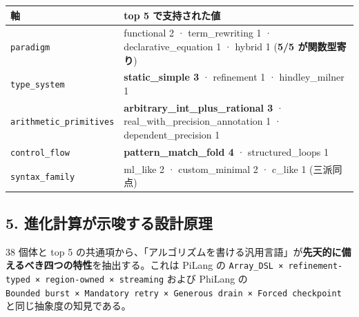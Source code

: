 \documentclass[
]{ltjsarticle}
\newcounter{none} %
\begin{document}
{\def\LTcaptype{none} %
\begin{longtable}[]{@{}
  >{\raggedright\arraybackslash}p{}
  >{\raggedright\arraybackslash}p{}@{}}
\toprule\noalign{}
\begin{minipage}[b]{\linewidth}\raggedright
軸
\end{minipage} & \begin{minipage}[b]{\linewidth}\raggedright
top 5 で支持された値
\end{minipage} \\
\midrule\noalign{}
\endhead
\bottomrule\noalign{}
\endlastfoot
\texttt{paradigm} & functional 2 · term\_rewriting 1 ·
declarative\_equation 1 · hybrid 1 (\textbf{5/5 が関数型寄り}) \\
\texttt{type\_system} & \textbf{static\_simple 3} · refinement 1 ·
hindley\_milner 1 \\
\texttt{arithmetic\_primitives} & \textbf{arbitrary\_int\_plus\_rational
3} · real\_with\_precision\_annotation 1 · dependent\_precision 1 \\
\texttt{control\_flow} & \textbf{pattern\_match\_fold 4} ·
structured\_loops 1 \\
\texttt{syntax\_family} & ml\_like 2 · custom\_minimal 2 · c\_like 1
(三派同点) \\
\end{longtable}
}

\subsection{5.
進化計算が示唆する設計原理}\label{ux9032ux5316ux8a08ux7b97ux304cux793aux5506ux3059ux308bux8a2dux8a08ux539fux7406}

38 個体と top 5
の共通項から、「アルゴリズムを書ける汎用言語」が\textbf{先天的に備えるべき四つの特性}を抽出する。これは
PiLang の
\texttt{Array\_DSL\ ×\ refinement-typed\ ×\ region-owned\ ×\ streaming}
および PhiLang の
\texttt{Bounded\ burst\ ×\ Mandatory\ retry\ ×\ Generous\ drain\ ×\ Forced\ checkpoint}
と同じ抽象度の知見である。
\end{document}
